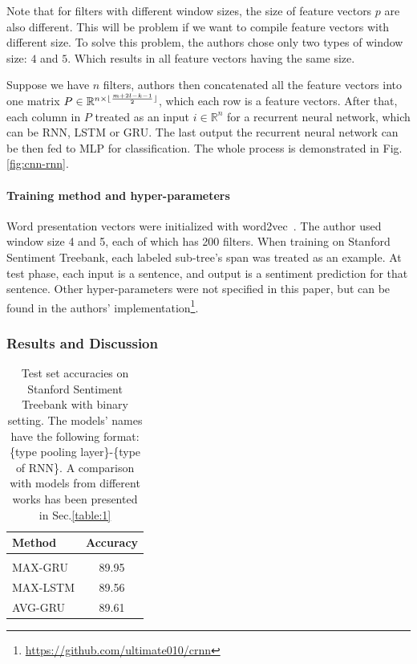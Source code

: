Note that for filters with different window sizes, the size of feature vectors \(p\) are also different. 
This will be problem if we want to compile feature vectors with different size.
To solve this problem, the authors chose only two types of window size: \(4\) and \(5\).
Which results in all feature vectors having the same size. 

Suppose we have \(n\) filters, authors then concatenated all the feature vectors into one matrix \(P \in \mathbb{R}^{n \times \lfloor \frac{m + 2l - k - 1}{2} \rfloor}\), which each row is a feature vectors. 
After that, each column in \(P\) treated as an input \(i \in \mathbb{R}^{n}\) for a recurrent neural network, which can be RNN, LSTM or GRU.
The last output the recurrent neural network can be then fed to MLP for classification.
The whole process is demonstrated in Fig.\ref{fig:cnn-rnn}.

\paragraph{Training method and hyper-parameters} 
Word presentation vectors were initialized with word2vec~\cite{word2vec}.
The author used window size 4 and 5, each of which has 200 filters. 
When training on Stanford Sentiment Treebank, each labeled sub-tree's span was treated as an example.
At test phase, each input is a sentence, and output is a sentiment prediction for that sentence.
Other hyper-parameters were not specified in this paper, but can be found in the authors' implementation\footnote{\url{https://github.com/ultimate010/crnn}}.

\subsubsection{Results and Discussion}
\begin{table}[H]
\centering
\begin{tabular}{l c} 
 \hline
 \hline 
 Method & Accuracy \\ [0.5ex] 
 \hline
 \hline
 \\  
 MAX-GRU & 89.95 \\ 
 MAX-LSTM & 89.56 \\ 
 AVG-GRU & 89.61 \\ 
 \hline
 \hline
\end{tabular}
\caption{Test set accuracies on Stanford Sentiment Treebank with binary setting. 
The models' names have the following format: \{type pooling layer\}-\{type of RNN\}.
A comparison with models from different works has been presented in Sec.\ref{table:1}}
\label{table:cnn-rnn}
\end{table}

